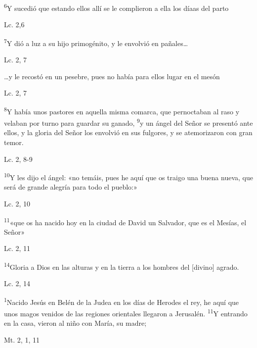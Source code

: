 \documentclass[a4paper,11pt]{article}
\begin{document}
      \textsuperscript{6}Y sucedió que estando ellos allí se le complieron a ella los díaas del parto
      \begin{flushright}
        Lc. 2,6        
      \end{flushright}
      
      \textsuperscript{7}Y dió a luz a su hijo primogénito, y le envolvió en pañales\ldots
      \begin{flushright}
        Lc. 2, 7          
      \end{flushright}
      
      \ldots y le recostó en un pesebre, pues no había para ellos lugar en el mesón      
      \begin{flushright}
        Lc. 2, 7         
      \end{flushright}
      
      \textsuperscript{8}Y había unos pastores en aquella misma comarca, que pernoctaban al raso y velaban por turno para guardar su ganado, \textsuperscript{9}y un ángel
      del Señor se presentó ante ellos, y la gloria del Señor los envolvió en sus fulgores, y se atemorizaron con gran temor.
      \begin{flushright}
        Lc. 2, 8-9         
      \end{flushright}
      
      \textsuperscript{10}Y les dijo el ángel: «no temáis, pues he aquí que os traigo una buena nueva, que será de grande alegría para todo el pueblo:»
      \begin{flushright}
        Lc. 2, 10         
      \end{flushright}

      \textsuperscript{11}«que os ha nacido hoy en la ciudad de David un Salvador, que es el Mesías, el Señor»
      \begin{flushright}
        Lc. 2, 11       
      \end{flushright}
      
      \textsuperscript{14}Gloria a Dios en las alturas y en la tierra a los hombres del [divino] agrado.
      \begin{flushright}
        Lc. 2, 14        
      \end{flushright}

      \textsuperscript{1}Nacido Jesús en Belén de la Judea en los días de Herodes el rey, he aquí que unos magos venidos de las regiones orientales llegaron a Jerusalén.
      \textsuperscript{11}Y entrando en la casa, vieron al niño con María, su madre;
      \begin{flushright}
        Mt. 2, 1, 11        
      \end{flushright}
      
\end{document}
